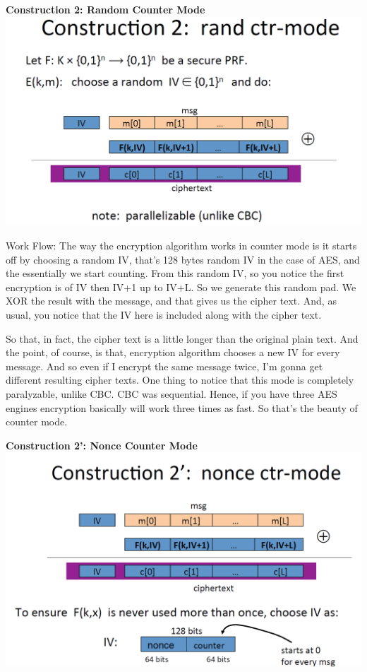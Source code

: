 \documentclass[11pt]{article}
\makeatletter
\def\maxwidth{\ifdim\Gin@nat@width>\linewidth\linewidth
    \else\Gin@nat@width\fi}
\let\Oldincludegraphics\includegraphics
\renewcommand{\includegraphics}[1]{\Oldincludegraphics[width=.8\maxwidth]{#1}}
\makeatother
\begin{document}
\textbf{Construction 2: Random Counter Mode}
\includegraphics{./Images/CounterMode.png}

Work Flow: The way the encryption algorithm works in counter mode is it
starts off by choosing a random IV, that's 128 bytes random IV in the
case of AES, and the essentially we start counting. From this random IV,
so you notice the first encryption is of IV then IV+1 up to IV+L. So we
generate this random pad. We XOR the result with the message, and that
gives us the cipher text. And, as usual, you notice that the IV here is
included along with the cipher text.

So that, in fact, the cipher text is a little longer than the original
plain text. And the point, of course, is that, encryption algorithm
chooses a new IV for every message. And so even if I encrypt the same
message twice, I'm gonna get different resulting cipher texts. One thing
to notice that this mode is completely paralyzable, unlike CBC. CBC was
sequential. Hence, if you have three AES engines encryption basically
will work three times as fast. So that's the beauty of counter mode.

\textbf{Construction 2': Nonce Counter Mode}
\includegraphics{./Images/CounterMode-2.png}
\end{document}
